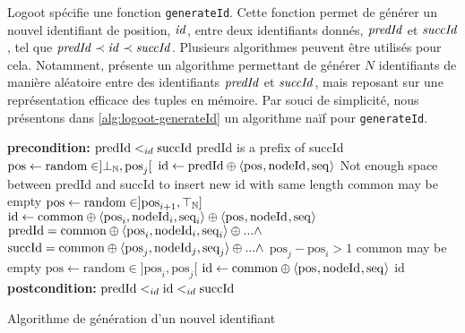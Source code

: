 Logoot spécifie une fonction \texttt{generateId}.
Cette fonction permet de générer un nouvel identifiant de position, $\mathit{id}$, entre deux identifiants donnés, $\mathit{predId}$ et $\mathit{succId}$, tel que $\mathit{predId} \prec \mathit{id} \prec \mathit{succId}$.
Plusieurs algorithmes peuvent être utilisés pour cela.
Notamment, \cite{2009-logoot-weiss} présente un algorithme permettant de générer $N$ identifiants de manière aléatoire entre des identifiants $\mathit{predId}$ et $\mathit{succId}$, mais reposant sur une représentation efficace des tuples en mémoire.
Par souci de simplicité, nous présentons dans \autoref{alg:logoot-generateId} un algorithme naïf pour \texttt{generateId}.

\begin{algorithm}[!ht]
  \footnotesize
  \begin{algorithmic}[1]
      \Statex \Comment \textbf{precondition:} $\text{predId} <_{id} \text{succId}$
       \label{alg:logoot-generateId-if-start}
        \Statex \Comment predId is a prefix of succId
        \State $\text{pos} \gets \text{random} \in ]\bot_\mathbb{N}, \text{pos}_j[$
        \State $\text{id} \gets \text{predId} \oplus \langle \text{pos}_{},\text{nodeId}_{},\text{seq}_{} \rangle$ \label{alg:logoot-generateId-if-end}
       \label{alg:logoot-generateId-elsif-start}
        \Statex \Comment Not enough space between predId and succId
        \Statex \Comment to insert new id with same length
        \Statex \Comment common may be empty
        \State $\text{pos} \gets \text{random} \in ]\text{pos}_{i+1}, \top_\mathbb{N}]$
        \State $\text{id} \gets \text{common} \oplus \langle \text{pos}_{i},\text{nodeId}_{i},\text{seq}_{i} \rangle \oplus \langle \text{pos}_{},\text{nodeId}_{},\text{seq}_{} \rangle$ \label{alg:logoot-generateId-elsif-end}
      \Else \label{alg:logoot-generateId-else-start}
        \Statex \Comment  $\text{predId} = \text{common} \oplus \langle \text{pos}_{i},\text{nodeId}_{i},\text{seq}_{i} \rangle \oplus ... \land$
        \Statex \Comment $\text{succId} = \text{common} \oplus  \langle \text{pos}_{j},\text{nodeId}_{j},\text{seq}_{j} \rangle \oplus ... \land$
        \Statex \Comment $\text{pos}_j - \text{pos}_i > 1$
        \Statex \Comment common may be empty
        \State $\text{pos} \gets \text{random} \in ]\text{pos}_i,\text{pos}_j[$
        \State $\text{id} \gets \text{common} \oplus \langle \text{pos}_{},\text{nodeId}_{},\text{seq}_{} \rangle$ \label{alg:logoot-generateId-else-end}
      \EndIf
      \State \Return id
      \Comment \textbf{postcondition:} $\text{predId} <_{id} \text{id} <_{id} \text{succId}$
    \EndFunction
  \end{algorithmic}
  \caption{Algorithme de génération d'un nouvel identifiant}
  \label{alg:logoot-generateId}
\end{algorithm}

